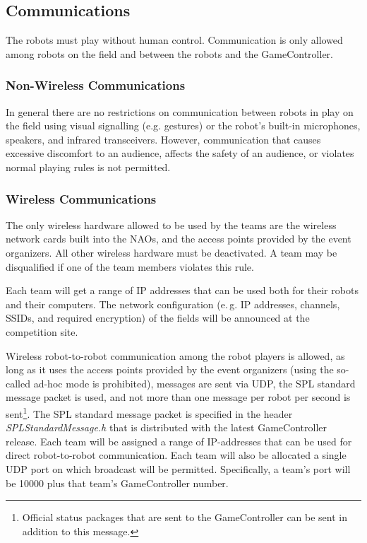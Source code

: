 \documentclass[12pt]{article}
\newcommand{\eg}{\mbox{e.\,g.}\xspace}
\begin{document}
\subsection{Communications}

The robots must play without human control. Communication is only allowed among robots on the field and between the robots and the GameController.

\subsubsection{Non-Wireless Communications}
\label{sec:acoustic}
In general there are no restrictions on communication between robots in play on the field using visual signalling (e.g. gestures) or the robot's built-in microphones, speakers, and infrared transceivers. However, communication that causes excessive discomfort to an audience, affects the safety of an audience, or violates normal playing rules is not permitted.

\subsubsection{Wireless Communications}
\label{sec:wireless}
The only wireless hardware allowed to be used by the teams are the wireless network cards built into the NAOs, and the access points provided by the event organizers. All other wireless hardware must be deactivated. A team may be disqualified if one of the team members violates this rule. 

Each team will get a range of IP addresses that can be used both for their robots and their computers. The network configuration (\eg IP addresses, channels, SSIDs, and required encryption) of the fields will be announced at the competition site.

Wireless robot-to-robot communication among the robot players is allowed, as long as it uses the access points provided by the event organizers (using the so-called ad-hoc mode is prohibited), messages are sent via UDP, the SPL standard message packet is used, and not more than one message per robot per second is sent\footnote{Official status packages that are sent to the GameController can be sent in addition to this message.}. The SPL standard message packet is specified in the header \emph{SPLStandardMessage.h} that is distributed with the latest GameController release. Each team will be assigned a range of IP-addresses that can be used for direct robot-to-robot communication. Each team will also be allocated a single UDP port on which broadcast will be permitted.  Specifically, a team's port will be 10000 plus that team's GameController number.
\end{document}
